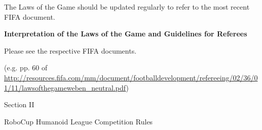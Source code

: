 \documentclass[a4paper]{article}
\begin{document}
    \vspace*{12cm}

    The Laws of the Game should be updated regularly to refer to the most
    recent FIFA document.

    \bigskip


    

    \clearpage

    
    
    
    
    
    
    
    
    
    
    
    
    
    
    
    
    
    
    
    
    

    \bigskip


    \bigskip

    \clearpage
    {\Huge{\bfseries
    Interpretation of the Laws of the Game and Guidelines for Referees}

    \vspace*{1.5cm}

    {\Large
    Please see the respective FIFA documents.}}

    {\scriptsize
    (e.g. pp. 60 of
    \url{http://resources.fifa.com/mm/document/footballdevelopment/refereeing/02/36/01/11/lawsofthegameweben_neutral.pdf})}




    \clearpage

    \begin{center}
        \Huge\bfseries{
            \vspace*{3cm}
            Section II

            \vspace*{2cm}

            RoboCup Humanoid League Competition Rules}
    \end{center}
\end{document}
